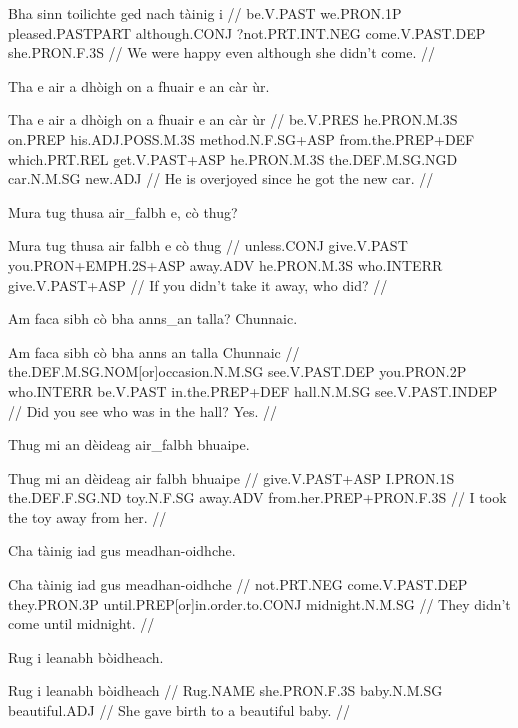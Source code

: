 \documentclass[a4paper,10pt]{article}
\begin{document}
\vspace{4mm}
\gla Bha sinn toilichte ged nach tàinig i  //
\glb be.V.PAST we.PRON.1P pleased.PASTPART although.CONJ ?not.PRT.INT.NEG come.V.PAST.DEP she.PRON.F.3S  //
\glft We were happy even although she didn't come. //
\endgl
\xe

\ex
\begingl
\glpre Tha e air a dhòigh on a fhuair e an càr ùr. 

\vspace{4mm}
\gla Tha e air a dhòigh on a fhuair e an càr ùr  //
\glb be.V.PRES he.PRON.M.3S on.PREP his.ADJ.POSS.M.3S method.N.F.SG+ASP from.the.PREP+DEF which.PRT.REL get.V.PAST+ASP he.PRON.M.3S the.DEF.M.SG.NGD car.N.M.SG new.ADJ  //
\glft He is overjoyed since he got the new car. //
\endgl
\xe

\ex
\begingl
\glpre Mura tug thusa air\_falbh e, cò thug? 

\vspace{4mm}
\gla Mura tug thusa {air falbh} e cò thug  //
\glb unless.CONJ give.V.PAST you.PRON+EMPH.2S+ASP away.ADV he.PRON.M.3S who.INTERR give.V.PAST+ASP  //
\glft If you didn't take it away, who did? //
\endgl
\xe

\ex
\begingl
\glpre Am faca sibh cò bha anns\_an talla? Chunnaic. 

\vspace{4mm}
\gla Am faca sibh cò bha {anns an} talla Chunnaic  //
\glb the.DEF.M.SG.NOM[or]occasion.N.M.SG see.V.PAST.DEP you.PRON.2P who.INTERR be.V.PAST in.the.PREP+DEF hall.N.M.SG see.V.PAST.INDEP  //
\glft Did you see who was in the hall? Yes. //
\endgl
\xe

\ex
\begingl
\glpre Thug mi an dèideag air\_falbh bhuaipe. 

\vspace{4mm}
\gla Thug mi an dèideag {air falbh} bhuaipe  //
\glb give.V.PAST+ASP I.PRON.1S the.DEF.F.SG.ND toy.N.F.SG away.ADV from.her.PREP+PRON.F.3S  //
\glft I took the toy away from her. //
\endgl
\xe

\ex
\begingl
\glpre Cha tàinig iad gus meadhan-oidhche. 

\vspace{4mm}
\gla Cha tàinig iad gus meadhan-oidhche  //
\glb not.PRT.NEG come.V.PAST.DEP they.PRON.3P until.PREP[or]in.order.to.CONJ midnight.N.M.SG  //
\glft They didn't come until midnight. //
\endgl
\xe

\ex
\begingl
\glpre Rug i leanabh bòidheach. 

\vspace{4mm}
\gla Rug i leanabh bòidheach  //
\glb Rug.NAME she.PRON.F.3S baby.N.M.SG beautiful.ADJ  //
\glft She gave birth to a beautiful baby. //
\endgl
\xe
\end{document}
